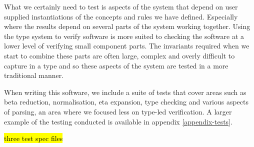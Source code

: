 What we certainly need to test is aspects of the system that depend on
user supplied instantiations of the concepts and rules we have
defined. Especially where the results depend on several parts of the
system working together. Using the type system to verify software is
more suited to checking the software at a lower level of verifying
small component parts. The invariants required when we start to
combine these parts are often large, complex and overly difficult to
capture in a type and so these aspects of the system are tested in a
more traditional manner.

When writing this software, we include a suite of tests that cover
areas such as beta reduction, normalisation, eta expansion, type
checking and various aspects of parsing, an area where we
focused less on type-led verification. A larger example of the testing
conducted is available in appendix \ref{appendix-tests}.

\hl{three test spec files}
